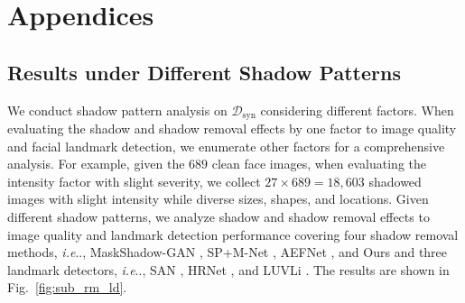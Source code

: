 \documentclass[10pt,twocolumn,letterpaper]{article}
\makeatletter
\newcommand{\figref}[1]{Fig.~\ref{#1}}
\DeclareRobustCommand\onedot{\futurelet\@let@token\@onedot}
\def\@onedot{\ifx\@let@token.\else.\null\fi\xspace}
\def\ie{\emph{i.e}\onedot} \def\Ie{\emph{I.e}\onedot}
\makeatother
\begin{document}

\appendix
\section{Appendices}
\renewcommand\thefigure{\Alph{figure}}  
\renewcommand\thetable{\Alph{table}}  
\renewcommand\thesection{\Alph{section}}  

\subsection{Results under Different Shadow Patterns}
We conduct shadow pattern analysis on $\mathcal{D}_\text{syn}$ considering different factors. When evaluating the shadow and shadow removal effects by one factor to image quality and facial landmark detection, we enumerate other factors for a comprehensive analysis. For example, given the $689$ clean face images, when evaluating the intensity factor with slight severity, we collect $27 \times 689=18,603$ shadowed images with slight intensity while diverse sizes, shapes, and locations. Given different shadow patterns, we analyze shadow and shadow removal effects to image quality and landmark detection performance covering four shadow removal methods, \ie, MaskShadow-GAN \cite{hu2019mask}, SP+M-Net \cite{le2019shadow}, AEFNet \cite{fu2021auto}, and Ours and three landmark detectors, \ie, SAN \cite{dong2018style}, HRNet \cite{wang2020deep}, and LUVLi \cite{kumar2020luvli}. The results are shown in \figref{fig:sub_rm_ld}. 
\end{document}
